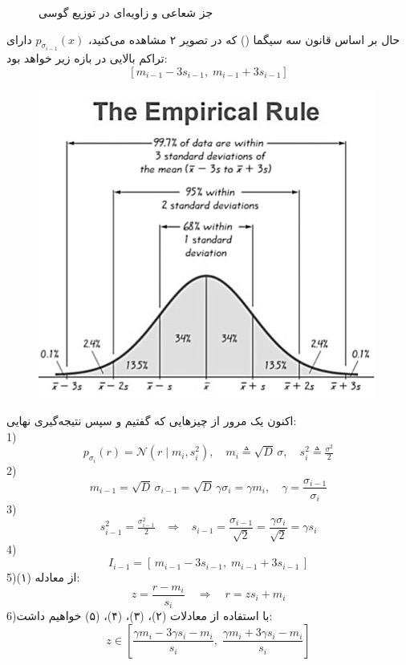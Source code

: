 \documentclass[12pt]{article}
\begin{document}
\begin{enumerate}
\begin{enumerate}
{\begin{figure}[h]
            \caption{جز شعاعی و زاویه‌ای در توزیع گوسی}
            \label{fig:q1_1}  
        \end{figure}
        حال بر اساس قانون سه سیگما () که در تصویر ۲ مشاهده می‌کنید، 
        $p_{\sigma_{i-1}}(x)$ 
        دارای تراکم بالایی در بازه زیر خواهد بود: 
        $$
        [m_{i-1} - 3s_{i-1}, \; m_{i-1} + 3s_{i-1}]
        $$
        \begin{figure}[h]
            \centering
            \includegraphics[width=\textwidth]{figs/Q1_2.jpg}
            \caption{}
            \label{fig:q1_2}  
        \end{figure}
        اکنون یک مرور از چیزهایی که گفتیم و سپس نتیجه‌گیری نهایی:\\
        1)
        $$
        p_{\sigma_i}(r) = \mathcal{N}(r \mid m_i, s_i^2), 
        \quad m_i \triangleq \sqrt{D}\,\sigma, 
        \quad s_i^2 \triangleq \tfrac{\sigma^2}{2}
        $$
        2)
        $$
        m_{i-1} = \sqrt{D}\,\sigma_{i-1} = \sqrt{D}\,\gamma\sigma_i = \gamma m_i,
        \quad \gamma = \frac{\sigma_{i-1}}{\sigma_i}
        $$
        3)
        $$
        s_{i-1}^2 = \tfrac{\sigma_{i-1}^2}{2} 
        \;\;\;\Rightarrow\;\;\;
        s_{i-1} = \frac{\sigma_{i-1}}{\sqrt{2}} = \frac{\gamma\sigma_i}{\sqrt{2}} = \gamma s_i
        $$
        4)
        $$
        I_{i-1} = [\, m_{i-1} - 3s_{i-1}, \; m_{i-1} + 3s_{i-1} \,]
        $$
        5)از معادله (۱):
        $$
        z = \frac{r - m_i}{s_i} \quad \Rightarrow \quad r = z s_i + m_i
        $$
        6)با استفاده از معادلات (۲)، (۳)، (۴)، (۵) خواهیم داشت:
        $$
        z \in \left[ \frac{\gamma m_i - 3\gamma s_i - m_i}{s_i}, \; \frac{\gamma m_i + 3\gamma s_i - m_i}{s_i} \right]
        $$
}
\end{enumerate}
\end{enumerate}
\end{document}
